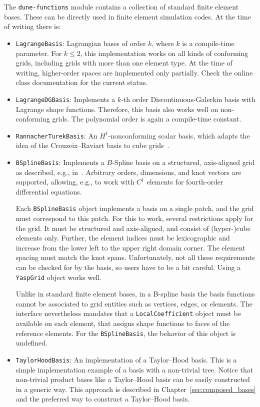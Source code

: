 \documentclass[a4paper,10pt,headings=normal,bibliography=totoc]{scrartcl}
\newcommand{\cpp}[1]{\lstinline[basicstyle=\ttfamily]!#1!}
\newcommand{\dunemodule}[1]{\texttt{#1}}
\begin{document}
The \dunemodule{dune-functions} module contains a collection of standard finite element bases.
These can be directly used in finite element simulation codes. At the time of writing there is:

\begin{itemize}
 \item \cpp{LagrangeBasis}: Lagrangian bases of order $k$, where $k$ is a compile-time parameter.
   For $k\le 2$, this implementation works on all kinds of conforming grids, including grids with more
   than one element type.  At the time of writing, higher-order spaces are implemented only partially.
   Check the online class documentation for the current status.

 \item \cpp{LagrangeDGBasis}: Implements a $k$-th order Discontinuous-Galerkin basis with Lagrange shape functions.
   Therefore, this basis also
   works well on non-conforming grids.  The polynomial order is again a compile-time constant.

 \item \cpp{RannacherTurekBasis}: An $H^1$-nonconforming scalar basis, which adapts the idea
   of the Crouzeix--Raviart basis to cube grids~\cite{rannacher_turek:1992}.

 \item \cpp{BSplineBasis}:  Implements a $B$-Spline basis on a structured, axis-aligned grid as described,
   e.g., in~\cite{cottrell_hughes_bazilevs:2009}.  Arbitrary orders, dimensions, and knot vectors are supported,
   allowing, e.g., to work with $C^1$ elements for fourth-order differential equations.

   Each \cpp{BSplineBasis} object implements a basis on a single patch, and the grid must correspond to this
   patch. For this to work, several restrictions apply for the grid.  It must be structured and axis-aligned,
   and consist of (hyper-)cube elements only.  Further, the element indices must be lexicographic and
   increase from the lower left to the upper right domain corner.  The element spacing must match the knot spans.
   Unfortunately, not all these requirements can be checked for by the basis, so users have to be a bit
   careful.  Using a \cpp{YaspGrid} object works well.

   Unlike in standard finite element bases, in a B-spline basis the basis functions cannot be associated
   to grid entities such as vertices, edges, or elements.  The interface nevertheless mandates that a
   \cpp{LocalCoefficient} object must be available on each element, that assigns shape functions
   to faces of the reference elements. For the \cpp{BSplineBasis}, the behavior of this
   object is undefined.

 \item \cpp{TaylorHoodBasis}:
   An implementation of a Taylor--Hood basis.
   This is a simple implementation example of a basis with a non-trivial tree.
   Notice that non-trivial product bases like a Taylor--Hood basis
   can be easily constructed in a generic way. This approach is described
   in Chapter~\ref{sec:composed_bases} and the preferred way to construct
   a Taylor--Hood basis.
\end{itemize}
\end{document}
